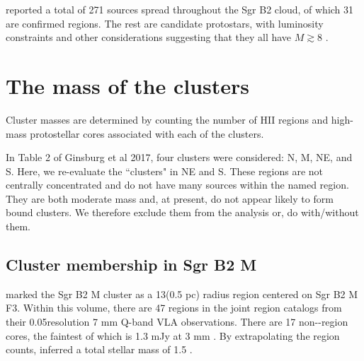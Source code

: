 \documentclass[twocolumn]{aastex61}
\begin{document}
\citet{Ginsburg2018a} reported a total of 271 sources spread throughout the Sgr
B2 cloud, of which 31 are confirmed \hii regions.  The rest are candidate
protostars, with luminosity constraints and other considerations suggesting
that they all have $M\gtrsim8$ \msun.


\section{The mass of the clusters}
Cluster masses are determined by counting the number of HII regions and high-mass
protostellar cores associated with each of the clusters.

In Table 2 of Ginsburg et al 2017, four clusters were considered: N, M, NE, and
S.  Here, we re-evaluate the ``clusters" in NE and S.  These regions are not
centrally concentrated and do not have many sources within the named region.
They are both moderate mass and, at present, do not appear likely to form bound
clusters.  We therefore exclude them from the analysis {\color{red} or, do with/without
them}.



\subsection{Cluster membership in Sgr B2 M}
\citet{Schmiedeke2016a} marked the Sgr B2 M cluster as a 13\arcsec  (0.5 pc) radius
region centered on Sgr B2 M F3.  Within this volume, there are 47 \hii regions
in the joint  \hii region catalogs \citep{Gaume1995a,De-Pree2015a} from their
0.05\arcsec resolution 7 mm Q-band
VLA observations.  There are 17 non-\hii-region cores, the faintest of which is
1.3 mJy at 3 mm \citep{Ginsburg2018a}.  By extrapolating the \hii region counts,
\citet{Ginsburg2018a} inferred a total stellar mass of 1.5 \msun.

% 
\end{document}
